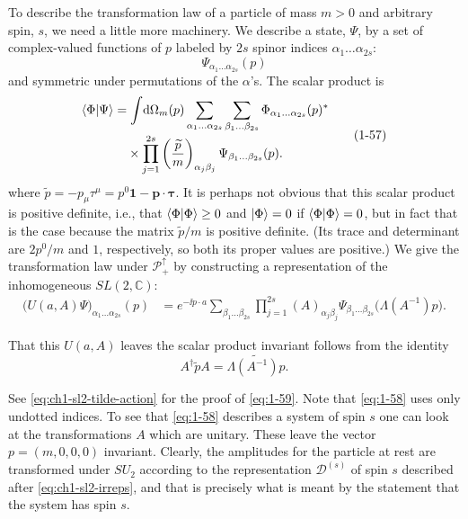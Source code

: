 To describe the transformation law of a particle of mass $m>0$ and arbitrary
spin, $s$, we need a little more machinery. We describe a state, $\Psi$, by a
set of complex-valued functions of $p$ labeled by $2s$ spinor indices
$\alpha_1\ldots\alpha_{2s}$:
\begin{equation*}
  \Psi_{\alpha_1\ldots\alpha_{2s}}(p)
\end{equation*}
and symmetric under permutations of the $\alpha$'s. The scalar product is
\begin{equation}
\begin{aligned}
  \braket{\Phi}{\Psi}
  &=\int\!\dd\Omega_m(p)
    \sum_{\alpha_1\ldots\alpha_{2s}}
    \sum_{\beta_1\ldots\beta_{2s}}
    \Phi_{\alpha_1\ldots\alpha_{2s}}(p)^*\\[-2pt]
  &\phantom{={}}\times
    \prod_{j=1}^{2s}
    \left(\frac{\widetilde p}{m}\right)_{\alpha_j\beta_j}
    \Psi_{\beta_1\ldots\beta_{2s}}(p).
\end{aligned}
\tag{1-57}\label{eq:1-57}
\end{equation}
where $\widetilde p=-p_\mu\tau^\mu=p^0\mathbf{1}-\mathbf{p}\mathbin{\cdot}\boldsymbol{\tau}$. It is perhaps not obvious that this
scalar product is positive definite, i.e., that $\langle \Phi\vert \Phi\rangle\geq0$ and
$\lvert \Phi\rangle=0$ if $\langle \Phi\vert \Phi\rangle=0$, but in fact that is the case because the matrix
$\widetilde p/m$ is positive definite. (Its trace and determinant are
$2p^0/m$ and $1$, respectively, so both its proper values are positive.) We
give the transformation law under $\mathcal{P}^{\uparrow}_{+}$ by constructing
a representation of the inhomogeneous $SL(2,\mathbb{C})$:
\begin{equation}
\begin{aligned}
  \bigl(U(a,A)\Psi\bigr)_{\alpha_1\ldots\alpha_{2s}}(p)
  &=e^{-\ii p\cdot a}
    \sum_{\beta_1\ldots\beta_{2s}}
    \prod_{j=1}^{2s}(A)_{\alpha_j\beta_j}
    \Psi_{\beta_1\ldots\beta_{2s}}\bigl(\Lambda(A^{-1})p\bigr).
\end{aligned}
\tag{1-58}\label{eq:1-58}
\end{equation}

That this $U(a,A)$ leaves the scalar product invariant follows from the
identity
\begin{equation}
  A^\dagger\widetilde p A=\widetilde{\Lambda(A^{-1})p}.
  \tag{1-59}\label{eq:1-59}
\end{equation}

See \eqref{eq:ch1-sl2-tilde-action} for the proof of \eqref{eq:1-59}. Note that \eqref{eq:1-58} uses only undotted
indices. To see that \eqref{eq:1-58} describes a system of spin $s$ one can look at the
transformations $A$ which are unitary. These leave the vector
$p=(m,0,0,0)$ invariant. Clearly, the amplitudes for the particle at rest are
transformed under $SU_2$ according to the representation $\mathcal{D}^{(s)}$
of spin $s$ described after \eqref{eq:ch1-sl2-irreps}, and that is precisely what is meant by the
statement that the system has spin $s$.

